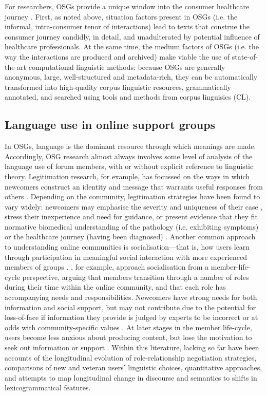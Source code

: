 \documentclass{article}
\renewcommand{\cite}{\parencite}
\begin{document}
	For researchers, OSGs provide a unique window into the consumer healthcare journey \cite{harvey_disclosures_2012}. First, as noted above, situation factors present in OSGs (i.e. the informal, intra-consumer tenor of interactions) lead to texts that construe the consumer journey candidly, in detail, and unadulterated by potential influence of healthcare professionals. At the same time, the medium factors of OSGs (i.e. the way the interactions are produced and archived) make viable the use of state-of-the-art computational linguistic methods: because OSGs are generally anonymous, large, well-structured and metadata-rich, they can be automatically transformed into high-quality corpus linguistic resources, grammatically annotated, and searched using tools and methods from corpus linguisics (CL).


\subsection{Language use in online support groups} \label{sect:intro-lang-in-osg}

	In OSGs, language is the dominant resource through which meanings are made. Accordingly, OSG research almost always involves some level of analysis of the language use of forum members, with or without explicit reference to linguistic theory. Legitimation research, for example, has focussed on the ways in which newcomers construct an identity and message that warrants useful responses from others \cite{galegher_legitimacy_1998,west_facework_2010}. Depending on the community, legitimation strategies have been found to vary widely: newcomers may emphasise the severity and uniqueness of their case , stress their inexperience and need for guidance, or present evidence that they fit normative biomedical understanding of the pathology (i.e. exhibiting symptoms) or the healthcare journey (having been diagnosed) \cite{varga2014grieving,smithson_membership_2011}. Another common approach to understanding online communities is socialisation---that is, how users learn through participation in meaningful social interaction with more experienced members of groups \cite{ochs_socialization_1991}. \textcite{lee_new_2014}, for example, approach socialisation from a member-life-cycle perspective, arguing that members transition through a number of roles during their time within the online community, and that each role has accompanying needs and responsibilities. Newcomers have strong needs for both information and social support, but may not contribute due to the potential for loss-of-face if information they provide is judged by experts to be incorrect \cite{fuller_innovation_2007} or at odds with community-specific values \cite{weber_missed_2011}. At later stages in the member life-cycle, users become less anxious about producing content, but lose the motivation to seek out information or support \cite{lee_new_2014}. Within this literature, lacking so far have been accounts of the longitudinal evolution of role-relationship negotiation strategies, comparisons of new and veteran users' linguistic choices, quantitative approaches, and attempts to map longitudinal change in discourse and semantics to shifts in lexicogrammatical features.
\end{document}
